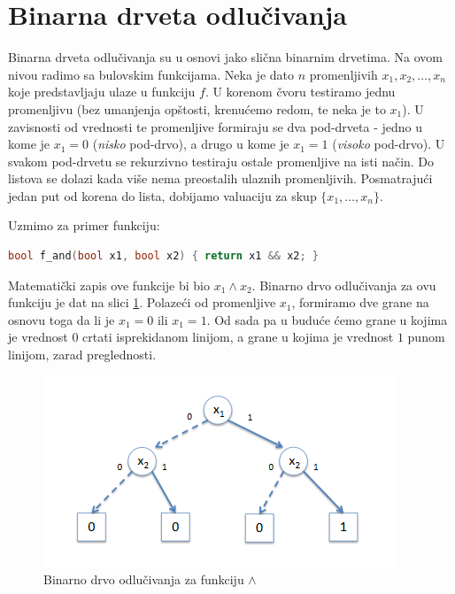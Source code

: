 \section{Binarna drveta odlu\v{c}ivanja}
\label{sec:BinarnaDrvetaOdlucivanja}

Binarna drveta odlu\v{c}ivanja su u osnovi jako sli\v{c}na binarnim drvetima. Na ovom nivou radimo sa bulovskim funkcijama. Neka je dato $n$ promenljivih $x_{1}, x_{2}, \dots , x_{n}$ koje predstavljaju ulaze u funkciju $f$. U korenom \v{c}voru testiramo jednu promenljivu (bez umanjenja op\v{s}tosti, krenu\'c{}emo redom, te neka je to $x_{1}$). U zavisnosti od vrednosti te promenljive formiraju se dva pod-drveta - jedno u kome je $x_{1} = 0$ (\emph{nisko} pod-drvo), a drugo u kome je $x_{1} = 1$ (\emph{visoko} pod-drvo). U svakom pod-drvetu se rekurzivno testiraju ostale promenljive na isti na\v{c}in. Do listova se dolazi kada vi\v{s}e nema preostalih ulaznih promenljivih. Posmatraju\'c{}i jedan put od korena do lista, dobijamo valuaciju za skup $\{x_{1}, \dots , x_{n}\}$.

Uzmimo za primer funkciju:

\begin{lstlisting}[language=C++]
    bool f_and(bool x1, bool x2) { return x1 && x2; }
\end{lstlisting}

\noindent Matematički zapis ove funkcije bi bio $x_{1} \wedge x_{2}$. Binarno drvo odlu\v{c}ivanja za ovu funkciju je dat na slici \ref{diag:BDAnd}. Polaze\'c{}i od promenljive $x_{1}$, formiramo dve grane na osnovu toga da li je $x_{1} = 0$ ili $x_{1} = 1$. Od sada pa u budu\'c{}e \'c{}emo grane u kojima je vrednost $0$ crtati isprekidanom linijom, a grane u kojima je vrednost $1$ punom linijom, zarad preglednosti.

\begin{figure}[H]
    \centering
    \includegraphics[scale=0.8]{slike/BD_And.PNG}
    \caption{Binarno drvo odlu\v{c}ivanja za funkciju $\wedge$}
    \label{diag:BDAnd}
\end{figure}

